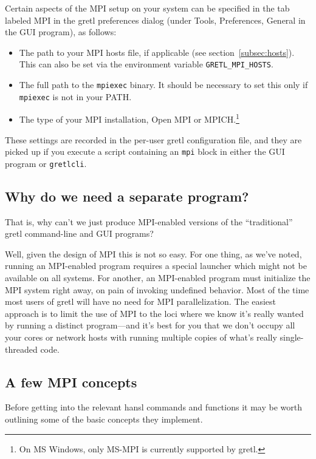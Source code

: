 \documentclass{article}
\begin{document}
Certain aspects of the MPI setup on your system can be specified in
the tab labeled \textsf{MPI} in the gretl preferences dialog (under
\textsf{Tools}, \textsf{Preferences}, \textsf{General} in the GUI
program), as follows:
\begin{itemize}
\item The path to your MPI hosts file, if applicable (see
  section~\ref{subsec:hosts}). This can also be set via the
  environment variable \verb|GRETL_MPI_HOSTS|.
\item The full path to the \texttt{mpiexec} binary. It should be
  necessary to set this only if \texttt{mpiexec} is not in your PATH.
\item The type of your MPI installation, \textsf{Open MPI} or
  \textsf{MPICH}.\footnote{On MS Windows, only \textsf{MS-MPI} is
    currently supported by gretl.}
\end{itemize}

These settings are recorded in the per-user gretl configuration file,
and they are picked up if you execute a script containing an
\texttt{mpi} block in either the GUI program or \texttt{gretlcli}.

\subsection{Why do we need a separate program?}
\label{subsec:why-new-prog}

That is, why can't we just produce MPI-enabled versions of the
``traditional'' gretl command-line and GUI programs?

Well, given the design of MPI this is not so easy. For one thing, as
we've noted, running an MPI-enabled program requires a special
launcher which might not be available on all systems. For another, an
MPI-enabled program must initialize the MPI system right away, on pain
of invoking undefined behavior. Most of the time most users of gretl
will have no need for MPI parallelization. The easiest approach is to
limit the use of MPI to the loci where we know it's really wanted by
running a distinct program---and it's best for you that we don't
occupy all your cores or network hosts with running multiple copies of
what's really single-threaded code.

\subsection{A few MPI concepts}
\label{subsec:concepts}

Before getting into the relevant hansl commands and functions it may
be worth outlining some of the basic concepts they implement.
\end{document}
